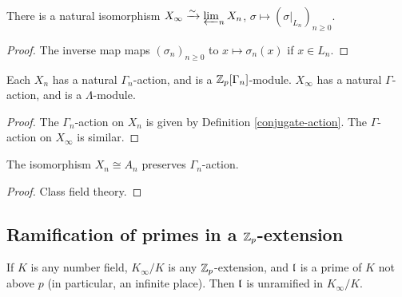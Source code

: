 \begin{lem}
\label{X-inf-is-proj-lim}
There is a natural isomorphism $X_\infty\xrightarrow{\sim}\varprojlim_n X_n$,
$\sigma\mapsto(\sigma|_{L_n})_{n\geq 0}$.
\end{lem}

\begin{proof}
The inverse map maps $(\sigma_n)_{n\geq 0}$
to $x\mapsto\sigma_n(x)$ if $x\in L_n$.
\end{proof}

\begin{lem}
\label{X-has-Gamma-action}
Each $X_n$ has a natural $\Gamma_n$-action, and is a ${\mathbb {Z}}_p[\Gamma_n]$-module.
$X_\infty$ has a natural $\Gamma$-action, and is a $\Lambda$-module.
\end{lem}

\begin{proof}
The $\Gamma_n$-action on $X_n$ is given by
Definition \ref{conjugate-action}.
The $\Gamma$-action on $X_\infty$ is similar.
\end{proof}

\begin{prop}
\label{Xn-isom-An-equivariant}
The isomorphism $X_n\cong A_n$ preserves $\Gamma_n$-action.
\end{prop}

\begin{proof}
Class field theory.
\end{proof}

\subsection{Ramification of primes in a ${\mathbb {Z}}_p$-extension}

\begin{prop}
\label{p:unr-outside-p}
If $K$ is any number field, $K_\infty/K$ is any ${\mathbb {Z}}_p$-extension,
and ${\mathfrak{l}}$ is a prime of $K$ not above $p$
(in particular, an infinite place).
Then ${\mathfrak{l}}$ is unramified in $K_\infty/K$.
\end{prop}

